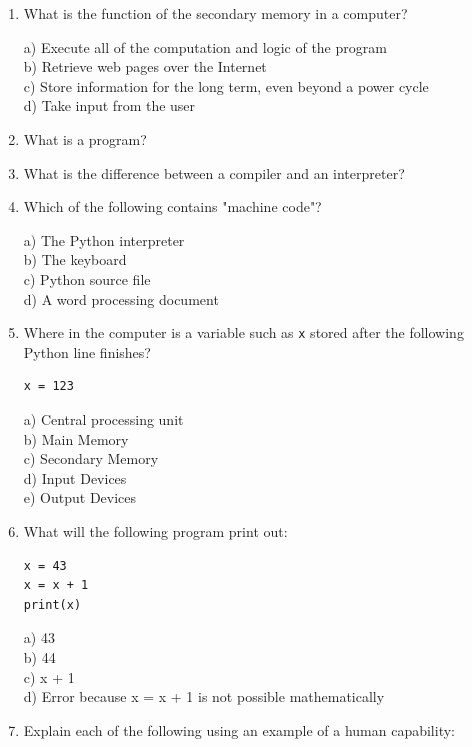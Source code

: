 \begin{enumerate}
\setlength\itemsep{2em}

\item What is the function of the secondary memory in a computer?

a) Execute all of the computation and logic of the program\\
b) Retrieve web pages over the Internet\\
c) Store information for the long term, even beyond a power cycle\\
d) Take input from the user

\item What is a program?

\item What is the difference between a compiler and an interpreter?

\item Which of the following contains "machine code"?

a) The Python interpreter\\
b) The keyboard\\
c) Python source file\\
d) A word processing document


\item  Where in the computer is a variable such as \verb|x| stored after the following Python line finishes?

\begin{Verbatim}[frame=single]
x = 123
\end{Verbatim}

a) Central processing unit\\
b) Main Memory\\
c) Secondary Memory\\
d) Input Devices\\
e) Output Devices

\item What will the following program print out:

\begin{Verbatim}[frame=single]
x = 43
x = x + 1
print(x)
\end{Verbatim}

a) 43\\
b) 44\\
c) x + 1\\
d) Error because x = x + 1 is not possible mathematically

\item Explain each of the following using an example of a human capability:


\end{enumerate}
